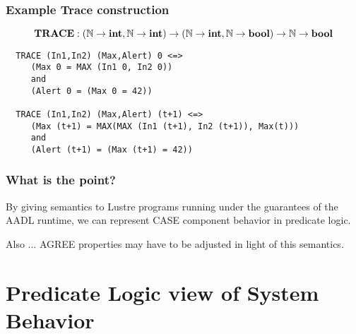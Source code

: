 \documentclass{beamer}
\newcommand{\konst}[1]{\ensuremath{\mbox{\bf{#1}}}}
\begin{document}
\begin{frame}[fragile]\frametitle{Example Trace construction}

\[ \konst{TRACE} : (\mathbb{N}\to\konst{int}, \mathbb{N}\to\konst{int})
 \to (\mathbb{N}\to\konst{int}, \mathbb{N}\to\konst{bool})
 \to \mathbb{N}\to\konst{bool}
\]

{\small
\begin{verbatim}
  TRACE (In1,In2) (Max,Alert) 0 <=>
     (Max 0 = MAX (In1 0, In2 0))
     and
     (Alert 0 = (Max 0 = 42))

  TRACE (In1,In2) (Max,Alert) (t+1) <=>
     (Max (t+1) = MAX(MAX (In1 (t+1), In2 (t+1)), Max(t)))
     and
     (Alert (t+1) = (Max (t+1) = 42))
\end{verbatim}
}

\end{frame}

\begin{frame}\frametitle{What is the point?}

By giving semantics to Lustre programs running under the guarantees of
the AADL runtime, we can represent CASE component behavior in
predicate logic.

Also ... AGREE properties may have to be adjusted in light of this semantics.

\end{frame}

\section {Predicate Logic view of System Behavior}
\end{document}
